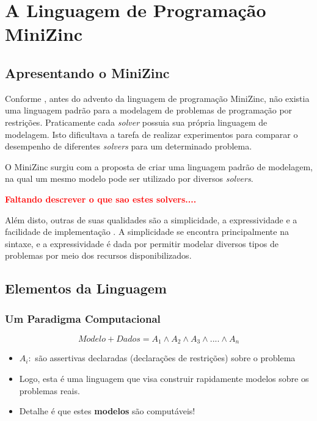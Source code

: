 \chapter{A Linguagem de Programação MiniZinc}


\section{Apresentando o MiniZinc}
\label{sc:minizinc}

Conforme \cite{mzntwds}, antes do advento da linguagem de programação MiniZinc, não existia uma linguagem padrão para a modelagem de problemas de programação por restrições. Praticamente cada \textit{solver} possuia sua própria linguagem de modelagem. Isto dificultava a tarefa de realizar experimentos para comparar o desempenho de diferentes \textit{solvers} para um determinado problema.

O MiniZinc surgiu com a proposta de criar uma linguagem padrão de modelagem, na qual um mesmo modelo pode ser utilizado por diversos \textit{solvers}. 

{\bf \textcolor{red}{Faltando descrever o que sao estes solvers....}}


Além disto, outras de suas qualidades são a simplicidade, a expressividade e a facilidade de implementação \cite{mzntwds}. A simplicidade se encontra principalmente na sintaxe, e a expressividade é dada por permitir modelar diversos tipos de problemas por meio dos recursos disponibilizados.

\section{Elementos da Linguagem}


\subsection{Um Paradigma Computacional}

$$ Modelo + Dados = A_1 \wedge A_2 \wedge A_3 \wedge  ....  \wedge  A_n $$

\begin{itemize}
  \item 
 $A_i: $ são assertivas declaradas (declarações de restrições) sobre o problema

  \item  Logo, esta é uma linguagem  que visa construir rapidamente
modelos sobre os problemas reais.

  \item  Detalhe é que estes \textbf{modelos} são computáveis!


\end{itemize}




